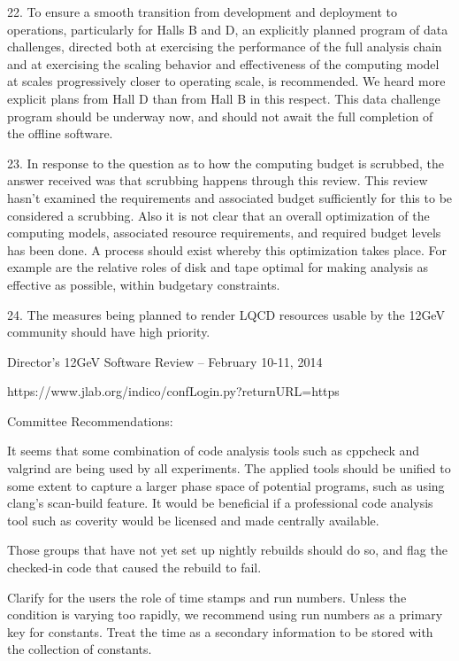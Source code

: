 \documentclass[12pt]{article}
\begin{document}
\begin{enumerate}
22. To ensure a smooth transition from development and deployment to operations, particularly for Halls B and D, an explicitly planned program of data challenges, directed both at exercising the performance of the full analysis chain and at exercising the scaling behavior and effectiveness of the computing model at scales progressively closer to operating scale, is recommended. We heard more explicit plans from Hall D than from Hall B in this respect. This data challenge program should be underway now, and should not await the full completion of the offline software. 

23. In response to the question as to how the computing budget is scrubbed, the answer received was that scrubbing happens through this review. This review hasn’t examined the requirements and associated budget sufficiently for this to be considered a scrubbing. Also it is not clear that an overall optimization of the computing models, associated resource requirements, and required budget levels has been done. A process should exist whereby this optimization takes place. For example are the relative roles of disk and tape optimal for making analysis as effective as possible, within budgetary constraints.

24. The measures being planned to render LQCD resources usable by the 12GeV community should have high priority. 

\end{enumerate}

Director’s 12GeV Software Review – February 10-11, 2014

https://www.jlab.org/indico/confLogin.py?returnURL=https%

Committee Recommendations:

It seems that some combination of code analysis tools such as cppcheck and valgrind are being used by all experiments. The applied tools should be unified to some extent to capture a larger phase space of potential programs, such as using clang’s scan-build feature. It would be beneficial if a professional code analysis tool such as coverity would be licensed and made centrally available.

Those groups that have not yet set up nightly rebuilds should do so, and flag the checked-in code that caused the rebuild to fail.

Clarify for the users the role of time stamps and run numbers. Unless the condition is varying too rapidly, we recommend using run numbers as a primary key for constants. Treat the time as a secondary information to be stored with the collection of constants.
\end{document}
